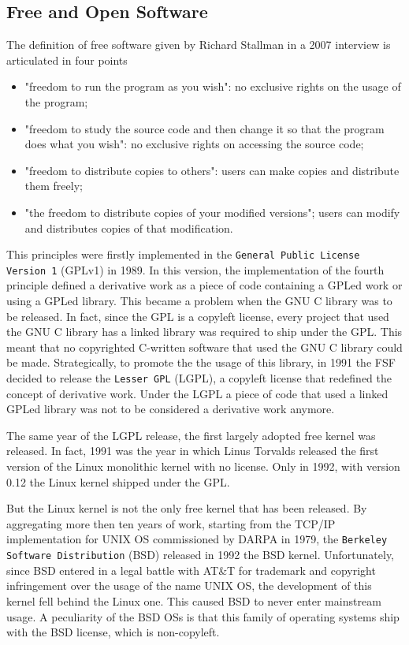 \subsection*{Free and Open Software}

The definition of free software given by Richard Stallman in a 2007 interview is articulated in four points

\begin{itemize}
    \item "freedom to run the program as you wish": no exclusive rights on the usage of the program;
    \item "freedom to study the source code and then change it so that the program does what you wish": no exclusive rights on accessing the source code;
    \item "freedom to distribute copies to others": users can make copies and distribute them freely;
    \item "the freedom to distribute copies of your modified versions"; users can modify and distributes copies of that modification.
\end{itemize}

This principles were firstly implemented in the \texttt{General Public License Version 1} (GPLv1) in 1989. In this version, the implementation of the fourth principle defined a derivative work as a piece of code containing a GPLed work or using a GPLed library. This became a problem when the GNU C library was to be released. In fact, since the GPL is a copyleft license, every project that used the GNU C library has a linked library was required to ship under the GPL. This meant that no copyrighted C-written software that used the GNU C library could be made.
Strategically, to promote the the usage of this library, in 1991 the FSF decided to release the \texttt{Lesser GPL} (LGPL), a copyleft license that redefined the concept of derivative work. Under the LGPL a piece of code that used a linked GPLed library was not to be considered a derivative work anymore.

The same year of the LGPL release, the first largely adopted free kernel was released. In fact, 1991 was the year in which Linus Torvalds released the first version of the Linux monolithic kernel with no license. Only in 1992, with version 0.12 the Linux kernel shipped under the GPL.

But the Linux kernel is not the only free kernel that has been released. By aggregating more then ten years of work, starting from the TCP/IP implementation for UNIX OS commissioned by DARPA in 1979, the \texttt{Berkeley Software Distribution} (BSD) released in 1992 the BSD kernel. Unfortunately, since BSD entered in a legal battle with AT\&T for trademark and copyright infringement over the usage of the name UNIX OS, the development of this kernel fell behind the Linux one. This caused BSD to never enter mainstream usage. A peculiarity of the BSD OSs is that this family of operating systems ship with the BSD license, which is non-copyleft.

